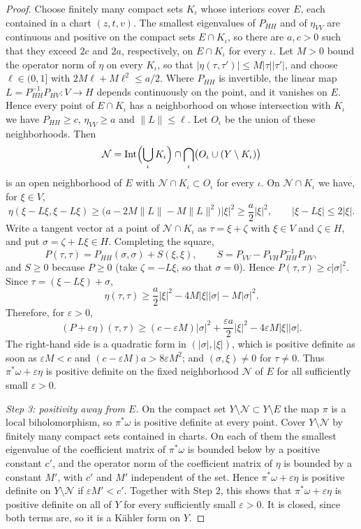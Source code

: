 \begin{proof}
Choose finitely many compact sets $K_\iota$ whose interiors cover $E$, each contained in a chart $(z,t,v)$. The smallest eigenvalues of $P_{HH}$ and of $\eta_{VV}$ are continuous and positive on the compact sets $E\cap K_\iota$, so there are $a,c>0$ such that they exceed $2c$ and $2a$, respectively, on $E\cap K_\iota$ for every $\iota$. Let $M>0$ bound the operator norm of $\eta$ on every $K_\iota$, so that $|\eta(\tau,\tau')|\leq M|\tau||\tau'|$, and choose $\ell\in(0,1]$ with $2M\ell+M\ell^2\leq a/2$. Where $P_{HH}$ is invertible, the linear map $L=P_{HH}^{-1}P_{HV}\colon V\to H$ depends continuously on the point, and it vanishes on $E$. Hence every point of $E\cap K_\iota$ has a neighborhood on whose intersection with $K_\iota$ we have $P_{HH}\geq c$, $\eta_{VV}\geq a$ and $\|L\|\leq\ell$. Let $O_\iota$ be the union of these neighborhoods. Then
\[
 \mathcal N=\operatorname{Int}\Bigl(\bigcup_\iota K_\iota\Bigr)\cap\bigcap_\iota\bigl(O_\iota\cup(Y\setminus K_\iota)\bigr)
\]
is an open neighborhood of $E$ with $\mathcal N\cap K_\iota\subset O_\iota$ for every $\iota$. On $\mathcal N\cap K_\iota$ we have, for $\xi\in V$,
\[
 \eta(\xi-L\xi,\xi-L\xi)\geq\bigl(a-2M\|L\|-M\|L\|^2\bigr)|\xi|^2\geq\frac a2|\xi|^2,\qquad|\xi-L\xi|\leq2|\xi|.
\]
Write a tangent vector at a point of $\mathcal N\cap K_\iota$ as $\tau=\xi+\zeta$ with $\xi\in V$ and $\zeta\in H$, and put $\sigma=\zeta+L\xi\in H$. Completing the square,
\[
 P(\tau,\tau)=P_{HH}(\sigma,\sigma)+S(\xi,\xi),\qquad S=P_{VV}-P_{VH}P_{HH}^{-1}P_{HV},
\]
and $S\geq0$ because $P\geq0$ (take $\zeta=-L\xi$, so that $\sigma=0$). Hence $P(\tau,\tau)\geq c|\sigma|^2$. Since $\tau=(\xi-L\xi)+\sigma$,
\[
 \eta(\tau,\tau)\geq\frac a2|\xi|^2-4M|\xi||\sigma|-M|\sigma|^2.
\]
Therefore, for $\varepsilon>0$,
\[
 (P+\varepsilon\eta)(\tau,\tau)\geq(c-\varepsilon M)|\sigma|^2+\frac{\varepsilon a}2|\xi|^2-4\varepsilon M|\xi||\sigma|.
\]
The right-hand side is a quadratic form in $(|\sigma|,|\xi|)$, which is positive definite as soon as $\varepsilon M<c$ and $(c-\varepsilon M)a>8\varepsilon M^2$; and $(\sigma,\xi)\neq0$ for $\tau\neq0$. Thus $\pi^*\omega+\varepsilon\eta$ is positive definite on the fixed neighborhood $\mathcal N$ of $E$ for all sufficiently small $\varepsilon>0$.

\emph{Step 3: positivity away from $E$.} On the compact set $Y\setminus\mathcal N\subset Y\setminus E$ the map $\pi$ is a local biholomorphism, so $\pi^*\omega$ is positive definite at every point. Cover $Y\setminus\mathcal N$ by finitely many compact sets contained in charts. On each of them the smallest eigenvalue of the coefficient matrix of $\pi^*\omega$ is bounded below by a positive constant $c'$, and the operator norm of the coefficient matrix of $\eta$ is bounded by a constant $M'$, with $c'$ and $M'$ independent of the set. Hence $\pi^*\omega+\varepsilon\eta$ is positive definite on $Y\setminus\mathcal N$ if $\varepsilon M'<c'$. Together with Step 2, this shows that $\pi^*\omega+\varepsilon\eta$ is positive definite on all of $Y$ for every sufficiently small $\varepsilon>0$. It is closed, since both terms are, so it is a K\"ahler form on $Y$.
\end{proof}

